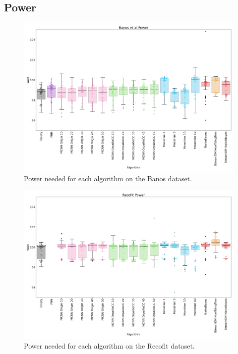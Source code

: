 \subsection{Power}
\begin{figure}[H]
	\includegraphics[width=\linewidth]{figures/results/banos_watt.png}
	\caption{Power needed for each algorithm on the Banos dataset.}
\end{figure}
\begin{figure}[H]
	\includegraphics[width=\linewidth]{figures/results/recofit_watt.png}
	\caption{Power needed for each algorithm on the Recofit dataset.}
\end{figure}
